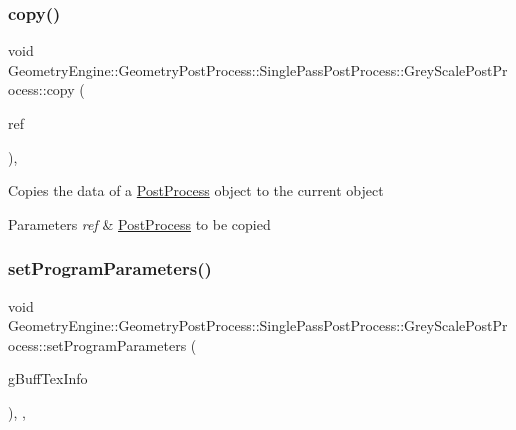 \subsubsection{\texorpdfstring{copy()}{copy()}}
{\footnotesize\ttfamily void Geometry\+Engine\+::\+Geometry\+Post\+Process\+::\+Single\+Pass\+Post\+Process\+::\+Grey\+Scale\+Post\+Process\+::copy (\begin{DoxyParamCaption}\item[{const \mbox{\hyperlink{class_geometry_engine_1_1_geometry_post_process_1_1_single_pass_post_process_1_1_grey_scale_post_process}{Grey\+Scale\+Post\+Process}} \&}]{ref }\end{DoxyParamCaption})\hspace{0.3cm}{\ttfamily [protected]}, {\ttfamily [virtual]}}

Copies the data of a \mbox{\hyperlink{class_geometry_engine_1_1_geometry_post_process_1_1_post_process}{Post\+Process}} object to the current object 
\begin{DoxyParams}{Parameters}
{\em ref} & \mbox{\hyperlink{class_geometry_engine_1_1_geometry_post_process_1_1_post_process}{Post\+Process}} to be copied \\
\hline
\end{DoxyParams}
\mbox{\label{class_geometry_engine_1_1_geometry_post_process_1_1_single_pass_post_process_1_1_grey_scale_post_process_ab60a2926e4d28cb0b808a3e01bbe85d3}} 
\subsubsection{\texorpdfstring{setProgramParameters()}{setProgramParameters()}}
{\footnotesize\ttfamily void Geometry\+Engine\+::\+Geometry\+Post\+Process\+::\+Single\+Pass\+Post\+Process\+::\+Grey\+Scale\+Post\+Process\+::set\+Program\+Parameters (\begin{DoxyParamCaption}\item[{const \mbox{\hyperlink{class_geometry_engine_1_1_g_buffer_texture_info}{G\+Buffer\+Texture\+Info}} \&}]{g\+Buff\+Tex\+Info }\end{DoxyParamCaption})\hspace{0.3cm}{\ttfamily [override]}, {\ttfamily [protected]}, {\ttfamily [virtual]}}

